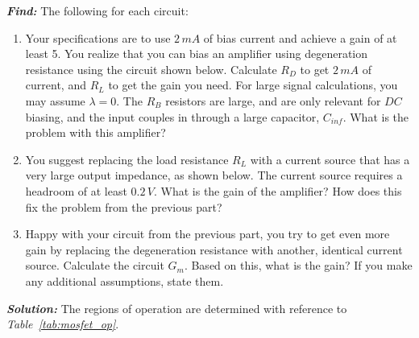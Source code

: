\documentclass[12pt, fleqn]{article}
\begin{document}
\noindent
\textbf{\emph{Find: }} The following for each circuit:

\begin{enumerate}[label=(\alph*)]
    \item{Your specifications are to use $2\,mA$ of bias current and achieve a gain of at least 5. You realize that you can bias an amplifier using degeneration resistance using the circuit shown below. Calculate $R_D$ to get $2\,mA$ of current, and $R_L$ to get the gain you need. For large signal calculations, you may assume $\lambda = 0$. The $R_B$ resistors are large, and are only relevant for $DC$ biasing, and the input couples in through a large capacitor, $C_{inf}$. What is the problem with this amplifier?}
    \item{You suggest replacing the load resistance $R_L$ with a current source that has a very large output impedance, as shown below. The current source requires a headroom of at least $0.2\,V$.  What is the gain of the amplifier?  How does this fix the problem from the previous part?}
    \item{Happy with your circuit from the previous part, you try to get even more gain by replacing the degeneration resistance with another, identical current source. Calculate the circuit $G_m$. Based on this, what is the gain? If you make any additional assumptions, state them.}
\end{enumerate}

\newpage\noindent
\textbf{\emph{Solution: }}The regions of operation are determined with reference to \textit{Table~\ref{tab:mosfet_op}}.
\end{document}
